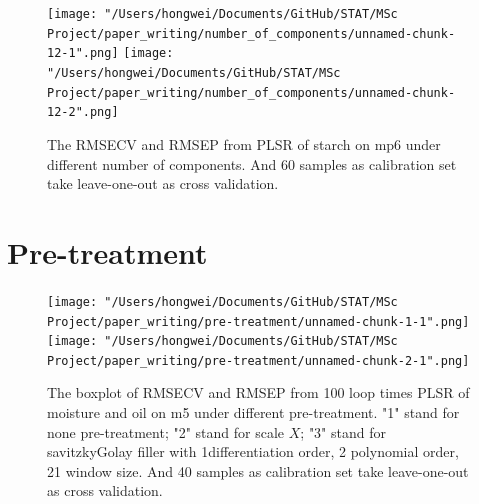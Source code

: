\documentclass[a4paper,12pt,titlepage]{article} %
\numberwithin{equation}{section}  %
\begin{document}
\begin{appendices}
	
	\begin{figure}[h]    %
		\centering           %
		\texttt{[image: "/Users/hongwei/Documents/GitHub/STAT/MSc Project/paper\_writing/number\_of\_components/unnamed-chunk-12-1".png]}  %
		\texttt{[image: "/Users/hongwei/Documents/GitHub/STAT/MSc Project/paper\_writing/number\_of\_components/unnamed-chunk-12-2".png]}  %
		\caption{The RMSECV and RMSEP from PLSR of starch on mp6 under different number of components. And 60 samples as calibration set take leave-one-out as cross validation.}          %
		\label{fig:components_12-1}               %
	\end{figure}                        %
	
	
	
		
		
		\clearpage
		\section{Pre-treatment}
		\label{app:pre-treatment}
		
			\begin{figure}[h]    %
			\centering           %
			\texttt{[image: "/Users/hongwei/Documents/GitHub/STAT/MSc Project/paper\_writing/pre-treatment/unnamed-chunk-1-1".png]}  %
			\texttt{[image: "/Users/hongwei/Documents/GitHub/STAT/MSc Project/paper\_writing/pre-treatment/unnamed-chunk-2-1".png]}  %
			\caption{The boxplot of RMSECV and RMSEP from 100 loop times PLSR of moisture and oil on m5 under different pre-treatment. "1" stand for none pre-treatment; "2" stand for scale $X$; "3" stand for savitzkyGolay filler with 1differentiation order, 2 polynomial order, 21 window size. And 40 samples as calibration set take leave-one-out as cross validation.}          %
			\label{fig:pretreatment-1-1}               %
		\end{figure}                        %


\end{appendices}
\end{document}

